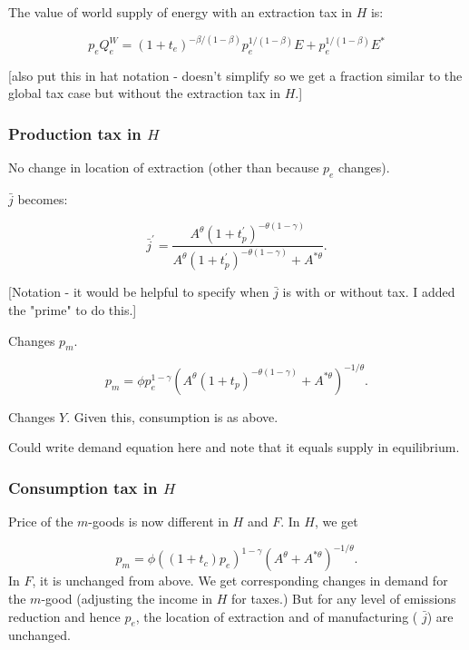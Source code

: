 \documentclass[notitlepage,12pt]{article}
\begin{document}
The value of world supply of energy with an extraction tax in $H$ is:

\begin{equation}
p_{e}Q_{e}^{W}=\left( 1+t_{e}\right) ^{-\beta /\left( 1-\beta \right)
}p_{e}^{1/\left( 1-\beta \right) }E+p_{e}^{1/\left( 1-\beta \right) }E^{\ast
}  \label{Supply of energy with extraction tax in H}
\end{equation}

[also put this in hat notation - doesn't simplify so we get a fraction
similar to the global tax case but without the extraction tax in $H$.]

\subsubsection{Production tax in $H$}

No change in location of extraction (other than because $p_{e}$ changes).

$\bar{j}$ becomes:

\begin{equation*}
\bar{j}^{\prime }=\frac{A^{\theta }\left( 1+t_{p}^{\prime }\right) ^{-\theta
\left( 1-\gamma \right) }}{A^{\theta }\left( 1+t_{p}^{\prime }\right)
^{-\theta \left( 1-\gamma \right) }+A^{\ast \theta }}.
\end{equation*}

[Notation - it would be helpful to specify when $\bar{j}$ is with or without
tax. I added the "prime" to do this.]

Changes $p_{m}$.

\begin{equation*}
p_{m}=\phi p_{e}^{1-\gamma }\left( A^{\theta }\left( 1+t_{p}\right)
^{-\theta \left( 1-\gamma \right) }+A^{\ast \theta }\right) ^{-1/\theta }.
\end{equation*}

Changes $Y$. Given this, consumption is as above.

Could write demand equation here and note that it equals supply in
equilibrium.

\subsubsection{Consumption tax in $H$}

Price of the $m$-goods is now different in $H$ and $F$. In $H$, we get

\begin{equation*}
p_{m}=\phi \left( \left( 1+t_{c}\right) p_{e}\right) ^{1-\gamma }\left(
A^{\theta }+A^{\ast \theta }\right) ^{-1/\theta }.
\end{equation*}%
In $F$, it is unchanged from above. We get corresponding changes in demand
for the $m$-good (adjusting the income in $H$ for taxes.) But for any level
of emissions reduction and hence $p_{e}$, the location of extraction and of
manufacturing ( $\bar{j}$) are unchanged.
\end{document}
